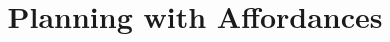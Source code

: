 
\title{Planning with Affordances}
\newcommand{\ignore}[1]{}


\maketitle

\begin{abstract}
\end{abstract}

